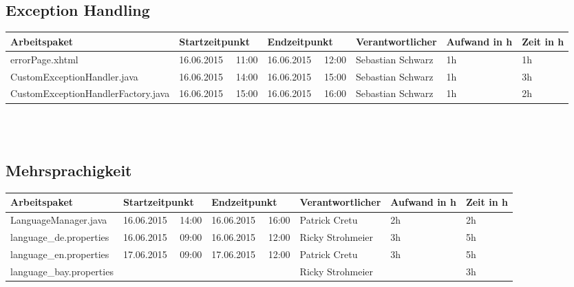 \begin{landscape}
\begin{tabular}{|p{10.3cm}|p{3.2cm}|p{3.2cm}|p{3.5cm}|p{1.7cm}|p{1.5cm}|}
	\end{tabular} \ \\
	\ \\
	
	\subsection{Exception Handling}
	\begin{tabular}{|p{10.3cm}|p{3.2cm}|p{3.2cm}|p{3.5cm}|p{1.7cm}|p{1.5cm}|}
		\hline  \textbf{Arbeitspaket} & \textbf{Startzeitpunkt} & \textbf{Endzeitpunkt} & \textbf{Verantwortlicher}  & \textbf{Aufwand in h} & \textbf{Zeit in h}\\ 
		\hline   errorPage.xhtml                                        & 16.06.2015 \ \ 11:00       & 16.06.2015 \ \ 12:00        & Sebastian Schwarz & 1h                 & 1h\\  
		\hline   CustomExceptionHandler.java                            & 16.06.2015 \ \ 14:00       & 16.06.2015 \ \ 15:00       & Sebastian Schwarz & 1h                 & 3h\\  
		\hline   CustomExceptionHandlerFactory.java                     & 16.06.2015 \ \ 15:00       & 16.06.2015 \ \ 16:00       & Sebastian Schwarz  & 1h                 & 2h\\  
		\hline 
	\end{tabular} \ \\
	\ \\	
	
	\subsection{Mehrsprachigkeit}
	\begin{tabular}{|p{10.3cm}|p{3.2cm}|p{3.2cm}|p{3.5cm}|p{1.7cm}|p{1.5cm}|}
		\hline  \textbf{Arbeitspaket} & \textbf{Startzeitpunkt} & \textbf{Endzeitpunkt} & \textbf{Verantwortlicher}  & \textbf{Aufwand in h} & \textbf{Zeit in h}\\ 
		\hline   LanguageManager.java                                  & 16.06.2015 \ \ 14:00        & 16.06.2015 \ \ 16:00       & Patrick Cretu  &  2h                 & 2h\\ 
		\hline   language\_de.properties                               & 16.06.2015 \ \ 09:00        & 16.06.2015 \ \ 12:00       & Ricky Strohmeier &  3h    & 5h \\
		\hline   language\_en.properties                               & 17.06.2015 \ \ 09:00        & 17.06.2015 \ \ 12:00       & Patrick Cretu  &  3h                 & 5h\\ 
		\hline   language\_bay.properties                               &  \ \   &    \ \        & Ricky Strohmeier  &                  & 3h\\ 
		\hline 
	\end{tabular} \ \\
	\ \\
	

\end{landscape}
